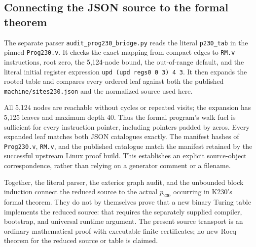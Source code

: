 \subsection{Connecting the JSON source to the formal theorem}

The separate parser \texttt{audit\_prog230\_bridge.py} reads the
literal \texttt{p230\_tab} in the pinned \texttt{Prog230.v}.  It checks
the exact mapping from compact edges to \texttt{RM.v} instructions,
root zero, the 5,124-node bound, the out-of-range default, and the
literal initial register expression
\texttt{upd (upd regs0 0 3) 4 3}.  It then expands the rooted table
and compares every ordered leaf against both the published
\texttt{machine/sites230.json} and the normalized source used here.

All 5,124 nodes are reachable without cycles or repeated visits;
the expansion has 5,125 leaves and maximum depth 40.  Thus the
formal program's walk fuel is sufficient for every instruction
pointer, including pointers padded by zeros.  Every expanded leaf
matches both JSON catalogues exactly.  The manifest hashes of
\texttt{Prog230.v}, \texttt{RM.v}, and the published catalogue match
the manifest retained by the successful upstream Linux proof build.
This establishes an explicit source-object correspondence, rather
than relying on a generator comment or a filename.

Together, the literal parser, the exterior graph audit, and the
unbounded block induction connect the reduced source to the actual
$p_{230}$ occurring in K230's formal theorem.  They do not by
themselves prove that a new binary Turing table implements the
reduced source: that requires the separately supplied compiler,
bootstrap, and universal runtime argument.  The present source
transport is an ordinary mathematical proof with executable finite
certificates; no new Rocq theorem for the reduced source or table
is claimed.
